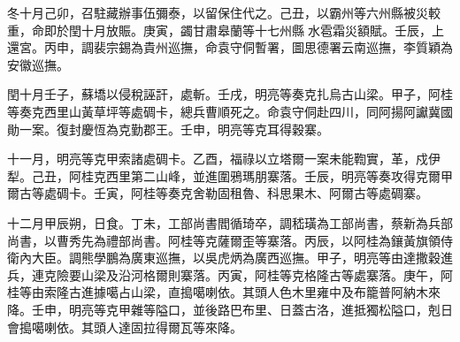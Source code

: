 \begin{pinyinscope}
冬十月己卯，召駐藏辦事伍彌泰，以留保住代之。己丑，以霸州等六州縣被災較重，命即於閏十月放賑。庚寅，蠲甘肅皋蘭等十七州縣水雹霜災額賦。壬辰，上還宮。丙申，調裴宗錫為貴州巡撫，命袁守侗暫署，圖思德署云南巡撫，李質穎為安徽巡撫。

閏十月壬子，蘇墧以侵稅誣訐，處斬。壬戌，明亮等奏克扎烏古山梁。甲子，阿桂等奏克西里山黃草坪等處碉卡，總兵曹順死之。命袁守侗赴四川，同阿揚阿讞冀國勛一案。復封慶恆為克勤郡王。壬申，明亮等克耳得穀寨。

十一月，明亮等克甲索諸處碉卡。乙酉，福祿以立塔爾一案未能鞫實，革，戍伊犁。己丑，阿桂克西里第二山峰，並進圍鴉瑪朋寨落。壬辰，明亮等奏攻得克爾甲爾古等處碉卡。壬寅，阿桂等奏克舍勒固租魯、科思果木、阿爾古等處碉寨。

十二月甲辰朔，日食。丁未，工部尚書閻循琦卒，調嵇璜為工部尚書，蔡新為兵部尚書，以曹秀先為禮部尚書。阿桂等克薩爾歪等寨落。丙辰，以阿桂為鑲黃旗領侍衛內大臣。調熊學鵬為廣東巡撫，以吳虎炳為廣西巡撫。甲子，明亮等由達撒穀進兵，連克險要山梁及沿河格爾則寨落。丙寅，阿桂等克格隆古等處寨落。庚午，阿桂等由索隆古進據噶占山梁，直搗噶喇依。其頭人色木里雍中及布籠普阿納木來降。壬申，明亮等克甲雜等隘口，並後路巴布里、日蓋古洛，進抵獨松隘口，剋日會搗噶喇依。其頭人達固拉得爾瓦等來降。


\end{pinyinscope}